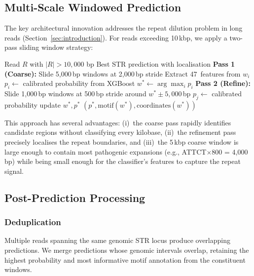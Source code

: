 \documentclass[11pt,twocolumn]{article}
\begin{document}
\subsection{Multi-Scale Windowed Prediction}\label{sec:windowed}

The key architectural innovation addresses the repeat dilution problem
in long reads (Section~\ref{sec:introduction}).  For reads exceeding
10\,kbp, we apply a two-pass sliding window strategy:

\begin{algorithm}[H]
\caption{Multi-Scale Windowed STR Detection}
\label{alg:windowed}
\begin{algorithmic}[1]
\Require Read $R$ with $|R| > 10{,}000$ bp
\Ensure Best STR prediction with localisation
\State \textbf{Pass 1 (Coarse):} Slide 5{,}000\,bp windows at 2{,}000\,bp stride
    \State Extract 47~features from $w_i$
    \State $p_i \gets$ calibrated probability from XGBoost
\EndFor
\State $w^* \gets \arg\max_i p_i$
    \State \textbf{Pass 2 (Refine):} Slide 1{,}000\,bp windows at 500\,bp stride
    \State \quad around $w^* \pm 5{,}000$\,bp
        \State $p_j \gets$ calibrated probability
         update $w^*, p^*$ \EndIf
    \EndFor
\EndIf
\State \Return $(p^*, \text{motif}(w^*), \text{coordinates}(w^*))$
\end{algorithmic}
\end{algorithm}

This approach has several advantages: (i)~the coarse pass rapidly
identifies candidate regions without classifying every kilobase,
(ii)~the refinement pass precisely localises the repeat boundaries,
and (iii)~the 5\,kbp coarse window is large enough to contain most
pathogenic expansions (e.g., ATTCT$\times$800 = 4{,}000\,bp) while
being small enough for the classifier's features to capture the repeat
signal.

\subsection{Post-Prediction Processing}\label{sec:postpred}

\subsubsection{Deduplication}
Multiple reads spanning the same genomic STR locus produce overlapping
predictions.  We merge predictions whose genomic intervals overlap,
retaining the highest probability and most informative motif annotation
from the constituent windows.
\end{document}
